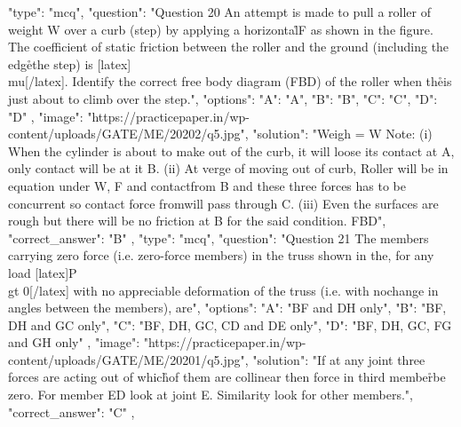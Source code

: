   {
    "type": "mcq",
    "question": "Question 20 An attempt is made to pull a roller of weight W over a curb (step) by applying a horizontal\r\nforce F as shown in the figure. The coefficient of static friction between the roller and the ground (including the edge\r\nof the step) is [latex]\\mu[/latex]. Identify the correct free body diagram (FBD) of the roller when the\r\nroller is just about to climb over the step.",
    "options": {
      "A": "A",
      "B": "B",
      "C": "C",
      "D": "D"
    },
    "image": "https://practicepaper.in/wp-content/uploads/GATE/ME/20202/q5.jpg",
    "solution": "Weigh = W Note: (i) When the cylinder is about to make out of the curb, it will loose its contact at \npoint A, only contact will be at it B. (ii) At verge of moving out of curb, Roller will be in equation under W, F and contact\nforce from B and these three forces has to be concurrent so contact force from\nB will pass through C. (iii) Even the surfaces are rough but there will be no friction at B for the said condition. FBD",
    "correct_answer": "B"
  },
  {
    "type": "mcq",
    "question": "Question 21 The members carrying zero force (i.e. zero-force members) in the truss shown in the\nfigure, for any load [latex]P \\gt 0[/latex] with no appreciable deformation of the truss (i.e. with no\nappreciable change in angles between the members), are",
    "options": {
      "A": "BF and DH only",
      "B": "BF, DH and GC only",
      "C": "BF, DH, GC, CD and DE only",
      "D": "BF, DH, GC, FG and GH only"
    },
    "image": "https://practicepaper.in/wp-content/uploads/GATE/ME/20201/q5.jpg",
    "solution": "If at any joint three forces are acting out of which\r\ntwo of them are collinear then force in third member\r\nmust be zero. For member ED look at joint E. Similarity look for other members.",
    "correct_answer": "C"
  },
